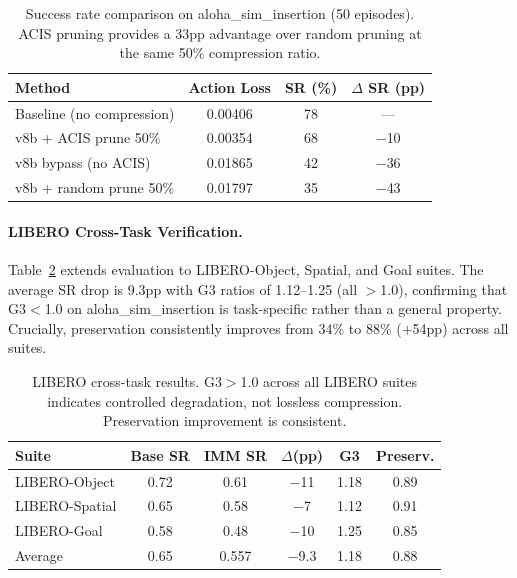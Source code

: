 \documentclass[10pt,twocolumn]{article}
\begin{document}
\begin{table}[t]
\centering
\caption{Success rate comparison on aloha\_sim\_insertion (50 episodes). ACIS pruning provides a 33pp advantage over random pruning at the same 50\% compression ratio.}
\label{tab:aloha}
\small
\begin{tabular}{@{}lccc@{}}
\toprule
Method & Action Loss & SR (\%) & $\Delta$ SR (pp) \\
\midrule
Baseline (no compression) & 0.00406 & 78 & --- \\
v8b + ACIS prune 50\% & 0.00354 & 68 & $-$10 \\
v8b bypass (no ACIS) & 0.01865 & 42 & $-$36 \\
v8b + random prune 50\% & 0.01797 & 35 & $-$43 \\
\bottomrule
\end{tabular}
\end{table}

\paragraph{LIBERO Cross-Task Verification.}
Table~\ref{tab:libero} extends evaluation to LIBERO-Object, Spatial, and Goal suites. The average SR drop is 9.3pp with G3 ratios of 1.12--1.25 (all $>$1.0), confirming that G3$<$1.0 on aloha\_sim\_insertion is task-specific rather than a general property. Crucially, preservation consistently improves from 34\% to 88\% ($+$54pp) across all suites.

\begin{table}[t]
\centering
\caption{LIBERO cross-task results. G3$>$1.0 across all LIBERO suites indicates controlled degradation, not lossless compression. Preservation improvement is consistent.}
\label{tab:libero}
\small
\begin{tabular}{@{}lccccc@{}}
\toprule
Suite & Base SR & IMM SR & $\Delta$(pp) & G3 & Preserv. \\
\midrule
LIBERO-Object  & 0.72 & 0.61 & $-$11 & 1.18 & 0.89 \\
LIBERO-Spatial & 0.65 & 0.58 & $-$7  & 1.12 & 0.91 \\
LIBERO-Goal    & 0.58 & 0.48 & $-$10 & 1.25 & 0.85 \\
\midrule
Average        & 0.65 & 0.557& $-$9.3& 1.18 & 0.88 \\
\bottomrule
\end{tabular}
\end{table}

\end{document}
